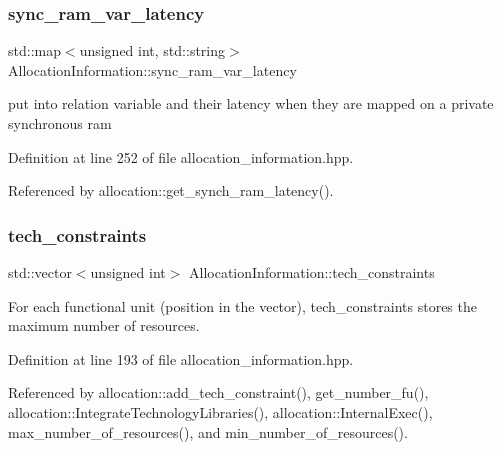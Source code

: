 \subsubsection{\texorpdfstring{sync\+\_\+ram\+\_\+var\+\_\+latency}{sync\_ram\_var\_latency}}
{\footnotesize\ttfamily std\+::map$<$unsigned int, std\+::string$>$ Allocation\+Information\+::sync\+\_\+ram\+\_\+var\+\_\+latency\hspace{0.3cm}{\ttfamily [private]}}



put into relation variable and their latency when they are mapped on a private synchronous ram 



Definition at line 252 of file allocation\+\_\+information.\+hpp.



Referenced by allocation\+::get\+\_\+synch\+\_\+ram\+\_\+latency().

\mbox{\label{classAllocationInformation_aa942e185b32ca21fc8a7fcfd99d30d94}} 
\subsubsection{\texorpdfstring{tech\+\_\+constraints}{tech\_constraints}}
{\footnotesize\ttfamily std\+::vector$<$unsigned int$>$ Allocation\+Information\+::tech\+\_\+constraints\hspace{0.3cm}{\ttfamily [private]}}



For each functional unit (position in the vector), tech\+\_\+constraints stores the maximum number of resources. 



Definition at line 193 of file allocation\+\_\+information.\+hpp.



Referenced by allocation\+::add\+\_\+tech\+\_\+constraint(), get\+\_\+number\+\_\+fu(), allocation\+::\+Integrate\+Technology\+Libraries(), allocation\+::\+Internal\+Exec(), max\+\_\+number\+\_\+of\+\_\+resources(), and min\+\_\+number\+\_\+of\+\_\+resources().

\mbox{\label{classAllocationInformation_a0827cc03477802e06ff5b4714b2e5116}} 
